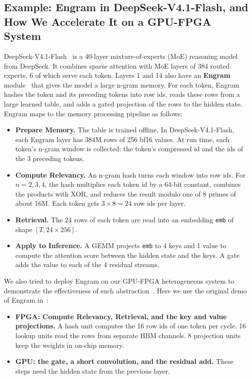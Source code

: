 \documentclass{article}
\newcommand{\code}[1]{\texttt{#1}}
\begin{document}
\subsection{Example: Engram in DeepSeek-V4.1-Flash, and How We Accelerate It on a GPU-FPGA System}
\label{sec:engram}

DeepSeek-V4.1-Flash~\citep{deepseek_v41_flash} is a 40-layer mixture-of-experts (MoE) reasoning model from DeepSeek. It combines sparse attention with MoE layers of 384 routed experts, 6 of which serve each token. Layers 1 and 14 also have an \textbf{Engram} module~\citep{engram} that gives the model a large n-gram memory. For each token, Engram hashes the token and its preceding tokens into row ids, reads these rows from a large learned table, and adds a gated projection of the rows to the hidden state. Engram maps to the memory processing pipeline as follows:

\begin{itemize}[leftmargin=*,itemsep=1pt]
  \item \textbf{Prepare Memory.} The table is trained offline. In DeepSeek-V4.1-Flash, each Engram layer has 384M rows of 256 bf16 values. At run time, each token's n-gram window is collected: the token's compressed id and the ids of the 3 preceding tokens.
  \item \textbf{Compute Relevancy.} An n-gram hash turns each window into row ids. For $n = 2, 3, 4$, the hash multiplies each token id by a 64-bit constant, combines the products with XOR, and reduces the result modulo one of 8 primes of about 16M. Each token gets $3 \times 8 = 24$ row ids per layer.
  \item \textbf{Retrieval.} The 24 rows of each token are read into an embedding \code{emb} of shape $[T, 24 \times 256]$.
  \item \textbf{Apply to Inference.} A GEMM projects \code{emb} to 4 keys and 1 value to compute the attention score between the hidden state and the keys. A gate adds the value to each of the 4 residual streams.
\end{itemize}

We also tried to deploy Engram on our GPU-FPGA heterogeneous system to demonstrate the effectiveness of such abstraction~\citep{heterollm}. Here we use the original demo of Engram in~\citep{engram_code}:

\begin{itemize}[leftmargin=*,itemsep=1pt]
  \item \textbf{FPGA: Compute Relevancy, Retrieval, and the key and value projections.} A hash unit computes the 16 row ids of one token per cycle. 16 lookup units read the rows from separate HBM channels. 8 projection units keep the weights in on-chip memory.
  \item \textbf{GPU: the gate, a short convolution, and the residual add.} These steps need the hidden state from the previous layer.
\end{itemize}
\end{document}
